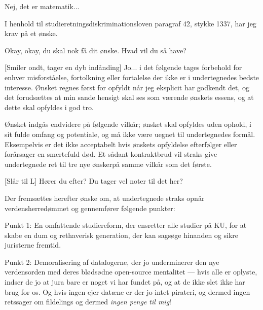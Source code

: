 \documentclass[a4paper,11pt]{article}
\begin{document}
\begin{sketch}
     Nej, det er matematik...



     I henhold til studieretningsdiskriminationsloven paragraf 42, stykke 1337, har jeg krav på et ønske.

     Okay, okay, du skal nok få dit ønske. Hvad vil du så have?

    [Smiler ondt, tager en dyb indånding] 
      Jo... i det følgende tages forbehold for enhver misforståelse, fortolkning eller fortalelse der ikke er i undertegnedes bedste interesse. 
      Ønsket regnes først for opfyldt når jeg eksplicit har godkendt det, og det forudsættes at min sande hensigt skal ses som værende ønskets essens, og at dette skal opfyldes i god tro.


      Ønsket indgås endvidere på følgende vilkår; ønsket skal opfyldes uden ophold, i sit fulde omfang og potentiale, og må ikke være uegnet til undertegnedes formål. Eksempelvis er det ikke acceptabelt hvis ønskets opfyldelse efterfølger eller forårsager en smertefuld død. Et sådant kontraktbrud vil straks give undertegnede ret til tre nye ønskerpå samme vilkår som det første.


    [Slår til L] 
      Hører du efter? Du tager vel noter til det her?

      Der fremsættes herefter ønske om, at undertegnede straks opnår verdensherredømmet og gennemfører følgende punkter: 

      Punkt 1: En omfattende studiereform, der ensretter alle studier på KU, for at skabe en dum og rethaverisk generation, der kan sagsøge hinanden og sikre juristerne fremtid.

      Punkt 2: Demoralisering af datalogerne, der jo underminerer den nye verdensorden med deres blødsødne open-source mentalitet --- hvis alle er oplyste, indser de jo at jura bare er noget vi har fundet på, og at de ikke slet ikke har brug for os. 
      Og hvis ingen ejer datæne er der jo intet pirateri, og dermed ingen retssager om fildelings og dermed \emph{ingen penge til mig}! 


\end{sketch}
\end{document}
